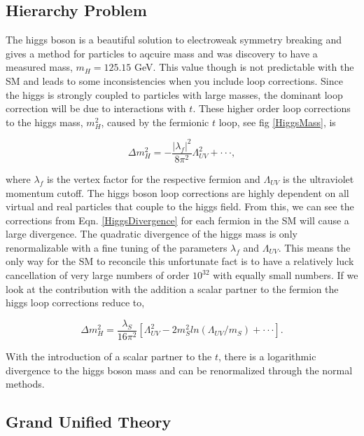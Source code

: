\subsection{Hierarchy Problem} 
The higgs boson is a beautiful solution to electroweak symmetry breaking and gives a method for particles to aqcuire mass and was discovery to have a measured mass, $m_{H}=125.15$ GeV. This value though is not predictable with the SM and leads to some inconsistencies when you include loop corrections. Since the higgs is strongly coupled to particles with large masses, the dominant loop correction will be due to interactions with $t$. These higher order loop corrections to the higgs mass, $m_H^2$, caused by the fermionic $t$ loop, see fig \ref{HiggsMass}, is

\begin{equation} \label{HiggsDivergence}
\Delta m_{H}^{2}=-\frac{|\lambda_{f}|^{2}}{8\pi^{2}}\Lambda_{UV}^{2}+\cdot\cdot\cdot,
\end{equation}

where $\lambda_f$ is the vertex factor for the respective fermion and $\Lambda_{UV}$ is the ultraviolet momentum cutoff. The higgs boson loop corrections are highly dependent on all virtual and real particles that couple to the higgs field. From this, we can see the corrections from Eqn. \ref{HiggsDivergence} for each fermion in the SM will cause a large divergence. The quadratic divergence of the higgs mass is only renormalizable with a fine tuning of the parameters $\lambda_f$ and $\Lambda_{UV}$. This means the only way for the SM to reconcile this unfortunate fact is to have a relatively luck cancellation of very large numbers of order $10^{32}$ with equally small numbers. If we look at the contribution with the addition a scalar partner to the fermion the higgs loop corrections reduce to,

\begin{equation}
\Delta m_{H}^{2}=\frac{\lambda_{S}}{16\pi^{2}}[\Lambda_{UV}^{2} - 2m_{S}^{2}ln(\Lambda_{UV}/m_{S})+\cdot\cdot\cdot].
\label{HiggsRenormalization}
\end{equation}

With the introduction of a scalar partner to the $t$, there is a logarithmic divergence to the higgs boson mass and can be renormalized through the normal methods.

\subsection{Grand Unified Theory}

